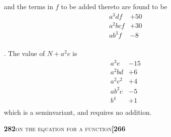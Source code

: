 \documentclass[11pt]{article}
\begin{document}
\noindent and the terms in $f$ to be added thereto are found to be
\[
\begin{array}{rr}
a^3 d f      & +50\\
a^2 b c f    & +30\\
a b^3 f      & -8\\
\end{array}
\]

\medskip

. The value of $N + a^2 e$ is
\[
\begin{array}{rr}
a^3 e     & -15\\
a^2 b d   & +6\\
a^2 c^2   & +4\\
a b^2 c   & -5\\
b^4       & +1\\
\end{array}
\]
which is a seminvariant, and requires no addition.

\newpage
\setcounter{page}{282}

\noindent\textbf{282}\hfill\textsc{on the equation for a function}\hfill\textbf{[266}

\medskip
\end{document}
